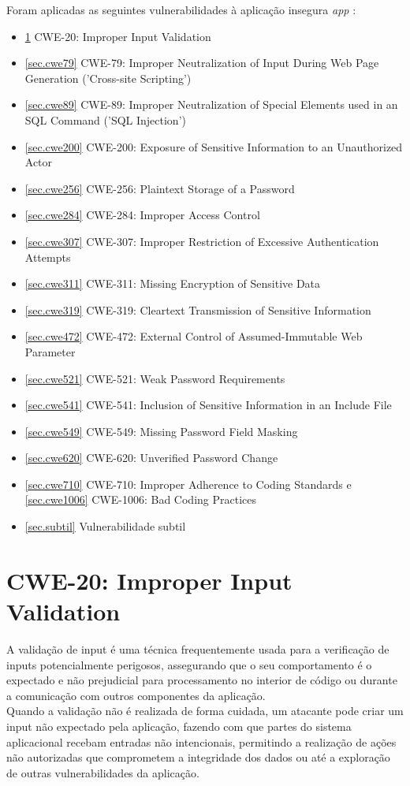 Foram aplicadas as seguintes vulnerabilidades à aplicação insegura \textit{app} :

\begin{itemize}
	\item \ref{sec.cwe20} CWE-20: Improper Input Validation
	\item \ref{sec.cwe79} CWE-79: Improper Neutralization of Input During Web Page Generation ('Cross-site Scripting')
    \item \ref{sec.cwe89} CWE-89: Improper Neutralization of Special Elements used in an SQL Command ('SQL Injection')
	\item \ref{sec.cwe200} CWE-200: Exposure of Sensitive Information to an Unauthorized Actor		
	\item \ref{sec.cwe256} CWE-256: Plaintext Storage of a Password
	\item \ref{sec.cwe284} CWE-284: Improper Access Control
	\item \ref{sec.cwe307} CWE-307: Improper Restriction of Excessive Authentication Attempts
	\item \ref{sec.cwe311} CWE-311: Missing Encryption of Sensitive Data
	\item \ref{sec.cwe319} CWE-319: Cleartext Transmission of Sensitive Information
        \item \ref{sec.cwe472} CWE-472: External Control of Assumed-Immutable Web Parameter
	\item \ref{sec.cwe521} CWE-521: Weak Password Requirements
	\item \ref{sec.cwe541} CWE-541: Inclusion of Sensitive Information in an Include File
	\item \ref{sec.cwe549} CWE-549: Missing Password Field Masking
        \item \ref{sec.cwe620} CWE-620: Unverified Password Change
	\item \ref{sec.cwe710} CWE-710: Improper Adherence to Coding Standards e \ref{sec.cwe1006} CWE-1006: Bad Coding Practices
    \item \ref{sec.subtil} Vulnerabilidade subtil
\end{itemize}
%
%
\section{CWE-20: Improper Input Validation}
\label{sec.cwe20}

A validação de input é uma técnica frequentemente usada para a verificação de inputs potencialmente perigosos, assegurando que o seu comportamento é o expectado e não prejudicial para processamento no interior de código ou durante a comunicação com outros componentes da aplicação. \\
Quando a validação não é realizada de forma cuidada, um atacante pode criar um input não expectado pela aplicação, fazendo com que partes do sistema aplicacional recebam entradas não intencionais, permitindo a realização de ações não autorizadas que comprometem a integridade dos dados ou até a exploração de outras vulnerabilidades da aplicação. \\

